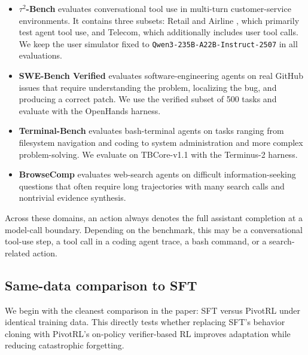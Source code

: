 \begin{itemize}
  \item \textbf{$\tau^2$-Bench} \citep{barres2025tau2bench} evaluates conversational tool use in multi-turn customer-service environments. It contains three subsets: Retail and Airline \citep{yao2024taubench}, which primarily test agent tool use, and Telecom, which additionally includes user tool calls. We keep the user simulator fixed to \texttt{Qwen3-235B-A22B-Instruct-2507} in all evaluations.
  
  \item \textbf{SWE-Bench Verified} \citep{jimenez2024swebench} evaluates software-engineering agents on real GitHub issues that require understanding the problem, localizing the bug, and producing a correct patch. We use the verified subset of 500 tasks and evaluate with the OpenHands harness.

  \item \textbf{Terminal-Bench} \citep{tbench_2025} evaluates bash-terminal agents on tasks ranging from filesystem navigation and coding to system administration and more complex problem-solving. We evaluate on TBCore-v1.1 with the Terminus-2 harness.

  \item \textbf{BrowseComp} \citep{wei2025browsecompsimplechallengingbenchmark} evaluates web-search agents on difficult information-seeking questions that often require long trajectories with many search calls and nontrivial evidence synthesis.
\end{itemize}

Across these domains, an action always denotes the full assistant completion at a model-call boundary. Depending on the benchmark, this may be a conversational tool-use step, a tool call in a coding agent trace, a bash command, or a search-related action.

\subsection{Same-data comparison to SFT}
\label{sec:same_data_sft}

We begin with the cleanest comparison in the paper: SFT versus PivotRL under identical training data. This directly tests whether replacing SFT's behavior cloning with PivotRL's on-policy verifier-based RL improves adaptation while reducing catastrophic forgetting.

